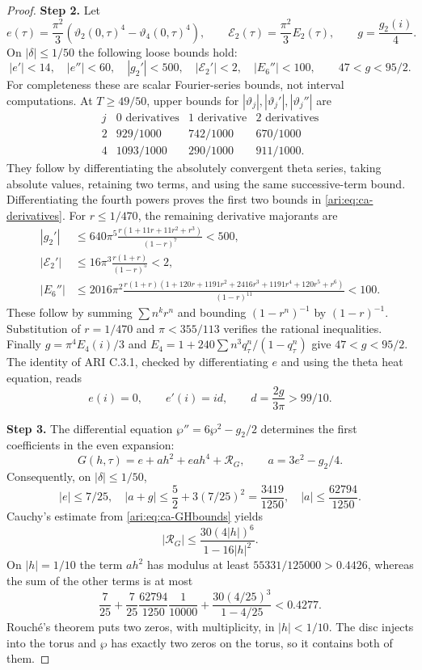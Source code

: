 \begin{proof}
\noindent\textbf{Step 2.} Let
\[
 e(\tau)=\frac{\pi^2}{3}(\vartheta_2(0,\tau)^4-
                              \vartheta_4(0,\tau)^4),\qquad
 \mathcal E_2(\tau)=\frac{\pi^2}{3}E_2(\tau),\qquad
 g=\frac{g_2(i)}4.
\]
On $|\delta|\le1/50$ the following loose bounds hold:
\begin{equation}\label{ari:eq:ca-derivatives}
 |e'|<14,\quad |e''|<60,\quad |g_2'|<500,
 \quad |\mathcal E_2'|<2,\quad |E_6''|<100,
 \qquad 47<g<95/2.
\end{equation}
For completeness these are scalar Fourier-series bounds, not
interval computations. At $T\ge49/50$, upper bounds for
$|\vartheta_j|,|\vartheta_j'|,|\vartheta_j''|$ are
\[
\begin{array}{c|ccc}
j&0\text{ derivatives}&1\text{ derivative}&2\text{ derivatives}\\ \hline
2&929/1000&742/1000&670/1000\\
4&1093/1000&290/1000&911/1000.
\end{array}
\]
They follow by differentiating the absolutely convergent theta
series, taking absolute values, retaining two terms, and using
the same successive-term bound. Differentiating the fourth
powers proves the first two bounds in \eqref{ari:eq:ca-derivatives}.
For $r\le1/470$, the remaining derivative majorants are
\begin{align*}
 |g_2'|&\le640\pi^5\frac{r(1+11r+11r^2+r^3)}{(1-r)^7}<500,\\
 |\mathcal E_2'|&\le16\pi^3\frac{r(1+r)}{(1-r)^5}<2,\\
 |E_6''|&\le2016\pi^2
 \frac{r(1+r)(1+120r+1191r^2+2416r^3+1191r^4+120r^5+r^6)}
 {(1-r)^{11}}<100.
\end{align*}
These follow by summing $\sum n^k r^n$ and bounding
$(1-r^n)^{-1}$ by $(1-r)^{-1}$. Substitution of $r=1/470$
and $\pi<355/113$ verifies the rational inequalities.
Finally $g=\pi^4E_4(i)/3$ and
$E_4=1+240\sum n^3q_\tau^n/(1-q_\tau^n)$ give $47<g<95/2$.
The identity of ARI C.3.1, checked by differentiating $e$ and using
the theta heat equation, reads
\[
 e(i)=0,\qquad e'(i)=id,\qquad d=\frac{2g}{3\pi}>99/10.
\]


\noindent\textbf{Step 3.} The differential equation $\wp''=6\wp^2-g_2/2$ determines the
first coefficients in the even expansion:
\[
 G(h,\tau)=e+a h^2+ea h^4+\mathcal R_G,
 \qquad a=3e^2-g_2/4.
\]
Consequently, on $|\delta|\le1/50$,
\[
 |e|\le7/25,\quad |a+g|\le\frac52+3(7/25)^2=\frac{3419}{1250},
 \quad |a|\le\frac{62794}{1250}.
\]
Cauchy's estimate from \eqref{ari:eq:ca-GHbounds} yields
\[
 |\mathcal R_G|\le
 \frac{30(4|h|)^6}{1-16|h|^2}.
\]
On $|h|=1/10$ the term $ah^2$ has modulus at least
$55331/125000>0.4426$, whereas the sum of the other terms is at most
\[
 \frac7{25}+\frac7{25}\frac{62794}{1250}\frac1{10000}
       +\frac{30(4/25)^3}{1-4/25}<0.4277.
\]
Rouch\'e's theorem puts two zeros, with multiplicity, in
$|h|<1/10$. The disc injects into the torus and $\wp$ has exactly
two zeros on the torus, so it contains both of them.



\end{proof}
